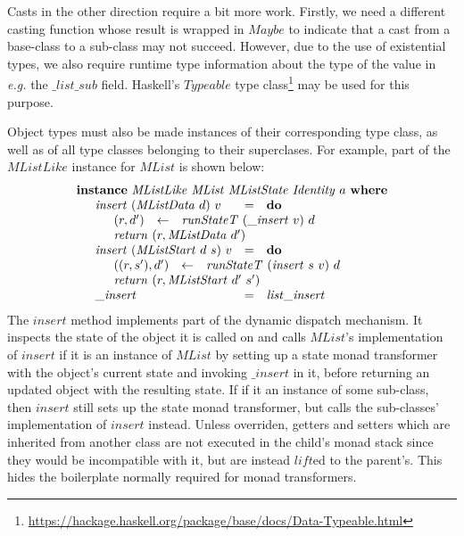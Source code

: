 Casts in the other direction require a bit more work. Firstly, we need a different casting function whose result is wrapped in $\mathit{Maybe}$ to indicate that a cast from a base-class to a sub-class may not succeed. However, due to the use of existential types, we also require runtime type information about the type of the value in \emph{e.g.} the $\_\mathit{list}\_\mathit{sub}$ field. Haskell's $\mathit{Typeable}$ type class\footnote{\url{https://hackage.haskell.org/package/base/docs/Data-Typeable.html}} may be used for this purpose.

Object types must also be made instances of their corresponding type class, as well as of all type classes belonging to their superclases. For example, part of the $\mathit{MListLike}$ instance for $\mathit{MList}$ is shown below:
\begin{displaymath}
\begin{array}{l}
\mathbf{instance}~\mathit{MListLike}~\mathit{MList}~\mathit{MListState}~\mathit{Identity}~a~\mathbf{where} \\
\quad \begin{array}{lcl}
\mathit{insert}~(\mathit{MListData}~d)~v & = & \mathbf{do} \\
\multicolumn{3}{l}{\quad \begin{array}{lcl}
    (r,d') & \leftarrow & \mathit{runStateT}~(\_\mathit{insert}~v)~d \\
    \multicolumn{3}{l}{\mathit{return}~(r,\mathit{MListData}~d')}
    \end{array}} \\
\mathit{insert}~(\mathit{MListStart}~d~s)~v & = & \mathbf{do} \\
\multicolumn{3}{l}{\quad \begin{array}{lcl}
    ((r,s'),d') & \leftarrow & \mathit{runStateT}~(\mathit{insert}~s~v)~d \\
    \multicolumn{3}{l}{\mathit{return}~(r,\mathit{MListStart}~d'~s')}
    \end{array}} \\
\_\mathit{insert} & = & \mathit{list}\_\mathit{insert}
\end{array}
\end{array}
\end{displaymath}
The $\mathit{insert}$ method implements part of the dynamic dispatch mechanism. It inspects the state of the object it is called on and calls $\mathit{MList}$'s implementation of $\mathit{insert}$ if it is an instance of $\mathit{MList}$ by setting up a state monad transformer with the object's current state and invoking $\_\mathit{insert}$ in it, before returning an updated object with the resulting state. If if it an instance of some sub-class, then $\mathit{insert}$ still sets up the state monad transformer, but calls the sub-classes' implementation of $\mathit{insert}$ instead. Unless overriden, getters and setters which are inherited from another class are not executed in the child's monad stack since they would be incompatible with it, but are instead $\mathit{lift}$ed to the parent's. This hides the boilerplate normally required for monad transformers.

